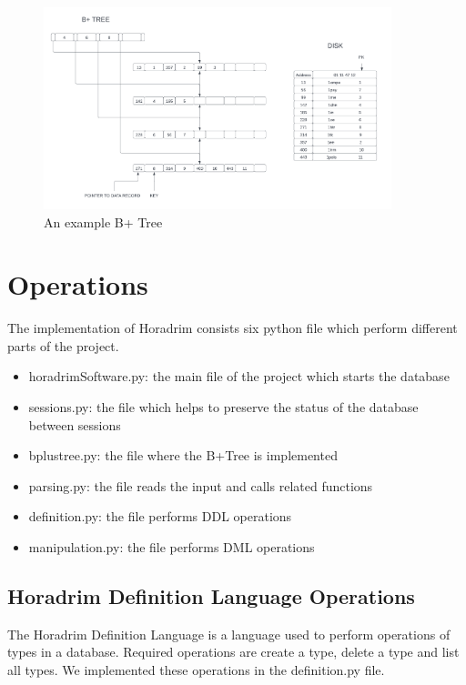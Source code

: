\documentclass{article}
\begin{document}
\begin{figure}[H]
    \centering
    \includegraphics[width=0.9\textwidth]{figures/bplustree.png}
    \caption{An example B+ Tree}
\end{figure}










\section{Operations}
\label{sec:operations}
The implementation of Horadrim consists six python file which perform different parts of the project.

\begin{itemize}
    \item horadrimSoftware.py: the main file of the project which starts the database
    \item sessions.py: the file which helps to preserve the status of the database between sessions
    \item bplustree.py: the file where the B+Tree is implemented
    \item parsing.py: the file reads the input and calls related functions
    \item definition.py: the file performs DDL operations
    \item manipulation.py: the file performs DML operations
\end{itemize}

\subsection{Horadrim Definition Language Operations}
\label{DLL}
The Horadrim Definition Language is a language used to perform operations of types in a database. Required operations are create a type, delete a type and list all types. We implemented these operations in the definition.py file.
\end{document}
